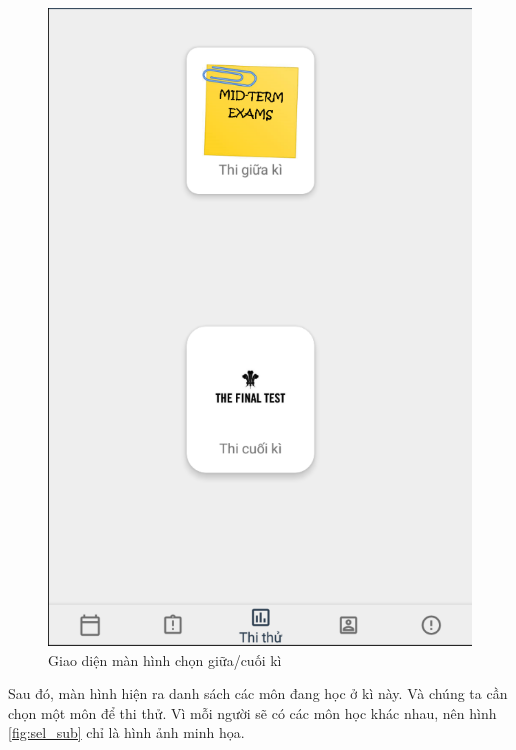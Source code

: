 \documentclass[a4paper]{article}
\begin{document}
\begin{figure}[H]
    \centering
    \includegraphics[scale=.3]{test_ui.png}
    \caption{Giao diện màn hình chọn giữa/cuối kì}
\end{figure}
Sau đó, màn hình hiện ra danh sách các môn đang học ở kì này. Và chúng ta cần chọn một môn để thi thử. Vì mỗi người sẽ có các môn học khác nhau, nên hình \ref{fig:sel_sub} chỉ là hình ảnh minh họa.
\end{document}
